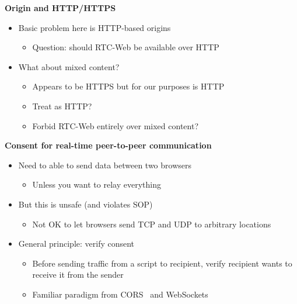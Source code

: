 \documentclass[helvetica]{seminar}
\newcommand{\heading}[1]{%
  \begin{center} 
    \large\bf 
    #1 
  \end{center} 
  \vspace{.4 in}}
\begin{document}
\begin{slide}
\heading{Origin and HTTP/HTTPS}

\begin{itemize}
\item Basic problem here is HTTP-based origins
  \begin{itemize}
  \item Question: should RTC-Web be available over HTTP
  \end{itemize}

\item What about mixed content?
  \begin{itemize}
  \item Appears to be HTTPS but for our purposes is HTTP
  \item Treat as HTTP?
  \item Forbid RTC-Web entirely over mixed content?
  \end{itemize}
\end{itemize}
\end{slide}



\begin{slide}
\heading{Consent for real-time peer-to-peer communication}

\begin{itemize}
\item Need to able to send data between two browsers
  \begin{itemize}
  \item Unless you want to relay everything
  \end{itemize}

\item But this is unsafe (and violates SOP)
  \begin{itemize}
  \item Not OK to let browsers send TCP and UDP to arbitrary locations
  \end{itemize}

\item General principle: verify consent
  \begin{itemize}
  \item Before sending traffic from a script to recipient, verify recipient
    wants to receive it from the sender
  \item Familiar paradigm from CORS~\cite{cors} and WebSockets\cite{hybi}
  \end{itemize}
\end{itemize}

\end{slide}
\end{document}
